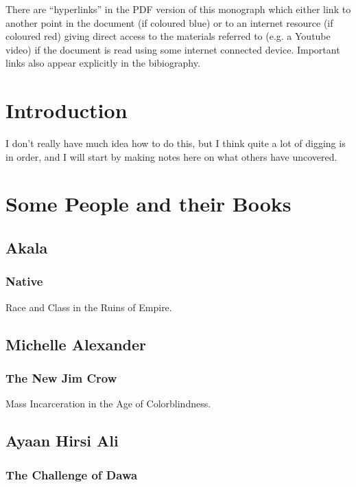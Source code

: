 \documentclass[10pt,titlepage]{book}
\begin{document}

There are ``hyperlinks'' in the PDF version of this monograph which either link to another point in the document  (if coloured blue) or to an internet resource  (if coloured red) giving direct access to the materials referred to (e.g. a Youtube video) if the document is read using some internet connected device.
Important links also appear explicitly in the bibiography.

\chapter{Introduction}


I don't really have much idea how to do this, but I think quite a lot of digging is in order, and I will start by making notes here on what others have uncovered.

\chapter{Some People and their Books}

\section{Akala}

\subsection{Native\cite{akala-native}}

Race and Class in the Ruins of Empire.

\section{Michelle Alexander}

\subsection{The New Jim Crow\cite{alexander-tnjc}}
Mass Incarceration in the Age of Colorblindness. 

\section{Ayaan Hirsi Ali}

\subsection{The Challenge of Dawa\cite{ali-dawa}}
\end{document}
